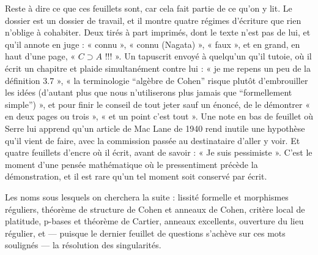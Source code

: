 \documentclass[11pt,a4paper]{article}
\begin{document}
\begin{resume}
Reste à dire ce que ces feuillets sont, car cela fait partie de ce qu'on y lit.
Le dossier est un dossier de travail, et il montre quatre régimes d'écriture
que rien n'oblige à cohabiter. Deux tirés à part imprimés, dont le texte n'est
pas de lui, et qu'il annote en juge : « connu », « connu (Nagata) », « faux »,
et en grand, en haut d'une page, « $C \supset A$ !!! ». Un tapuscrit envoyé à
quelqu'un qu'il tutoie, où il écrit un chapitre et plaide simultanément contre
lui : « je me repens un peu de la définition 3.7 », « la terminologie “algèbre
de Cohen” risque plutôt d'embrouiller les idées (d'autant plus que nous
n'utiliserons plus jamais que “formellement simple”) », et pour finir le
conseil de tout jeter sauf un énoncé, de le démontrer « en deux pages ou
trois », « et un point c'est tout ». Une note en bas de feuillet où Serre lui
apprend qu'un article de Mac Lane de 1940 rend inutile une hypothèse qu'il
vient de faire, avec la commission passée au destinataire d'aller y voir. Et
quatre feuillets d'encre où il écrit, avant de savoir : « Je suis
pessimiste ». C'est le moment d'une pensée mathématique où le pressentiment
précède la démonstration, et il est rare qu'un tel moment soit conservé par
écrit.

Les noms sous lesquels on cherchera la suite : lissité formelle et morphismes
réguliers, théorème de structure de Cohen et anneaux de Cohen, critère local de
platitude, p-bases et théorème de Cartier, anneaux excellents, ouverture du
lieu régulier, et — puisque le dernier feuillet de questions s'achève sur ces
mots soulignés — la résolution des singularités.

\end{resume}
\end{document}
